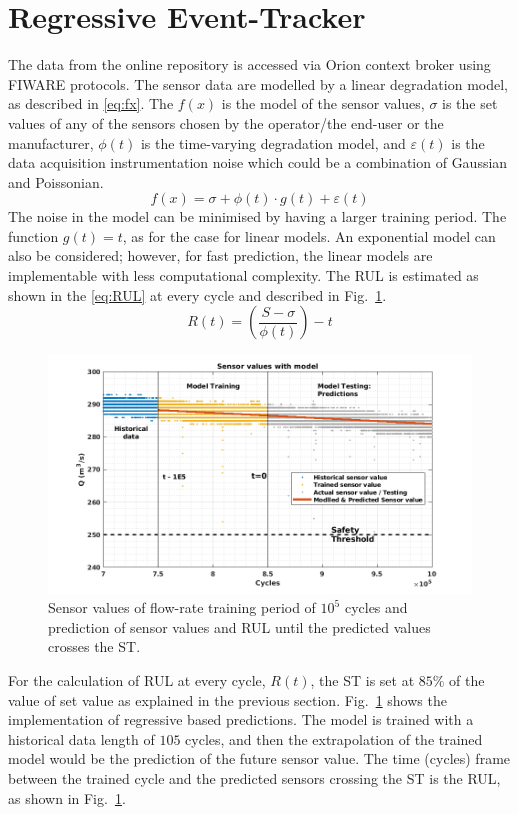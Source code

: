 \documentclass[conference]{IEEEtran}
\begin{document}
\section{Regressive Event-Tracker}
\label{sec:RET}
The data from the online repository is accessed via Orion context broker using FIWARE protocols. The sensor data are modelled by a linear degradation model, as described in \eqref{eq:fx}. The $f(x)$ is the model of the sensor values, $\sigma$ is the set values of any of the sensors chosen by the operator/the end-user or the manufacturer, $\phi(t)$ is the time-varying degradation model, and $\varepsilon(t)$ is the data acquisition instrumentation noise which could be a combination of Gaussian and Poissonian.
\begin{equation}
    f(x) = \sigma + \phi(t)\cdot g(t) + \varepsilon(t)
    \label{eq:fx}
\end{equation}
The noise in the model can be minimised by having a larger training period. The function $g(t)=t$, as for the case for linear models. An exponential model can also be considered; however, for fast prediction, the linear models are implementable with less computational complexity. The RUL is estimated as shown in the \eqref{eq:RUL} at every cycle and described in Fig.~\ref{fig:Model}.
\begin{equation}
    R(t) = \left(\frac{S-\sigma}{\phi(t)}\right)-t
    \label{eq:RUL}
\end{equation}
\begin{figure}[tbp]
\centerline{\includegraphics[width=\linewidth]{Model.png}}
\caption{Sensor values of flow-rate training period of $10^5$ cycles and prediction of sensor values and RUL until the predicted values crosses the ST.}
\label{fig:Model}
\end{figure}
For the calculation of RUL at every cycle, $R(t)$, the ST is set at $85\%$ of the value of set value as explained in the previous section. Fig.~\ref{fig:Model} shows the implementation of regressive based predictions. The model is trained with a historical data length of $105$ cycles, and then the extrapolation of the trained model would be the prediction of the future sensor value. The time (cycles) frame between the trained cycle and the predicted sensors crossing the ST is the RUL, as shown in Fig.~\ref{fig:Model}.
\end{document}
